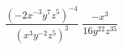 {$\dfrac{\left(-2x^{-3}y^7z^5\right)^{-4}}{\left(x^3y^{-2}z^5\right)^3}$}
{$\dfrac{-x^3}{16y^{22}z^{35}}$}
